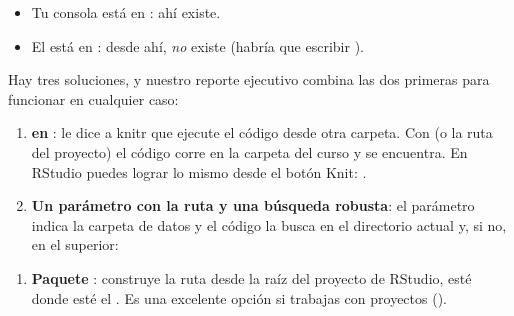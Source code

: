 \begin{itemize}
  \item Tu consola está en : ahí
         existe.
  \item El  está en : desde
        ahí,  \emph{no} existe (habría
        que escribir ).
\end{itemize}

Hay tres soluciones, y nuestro reporte ejecutivo combina las dos primeras
para funcionar en cualquier caso:

\begin{enumerate}
  \item \textbf{ en }: le dice a
        knitr que ejecute el código desde otra carpeta. Con
         (o la ruta del proyecto) el código
        corre en la carpeta del curso y  se encuentra.
        En RStudio puedes lograr lo mismo desde el botón Knit:
        .
  \item \textbf{Un parámetro con la ruta y una búsqueda robusta}: el
        parámetro  indica la carpeta de datos y el código
        la busca en el directorio actual y, si no, en el superior:
\end{enumerate}


\begin{enumerate}[resume]
  \item \textbf{Paquete }:  construye la ruta desde la raíz del proyecto
        de RStudio, esté donde esté el . Es una excelente
        opción si trabajas con proyectos ().
\end{enumerate}

